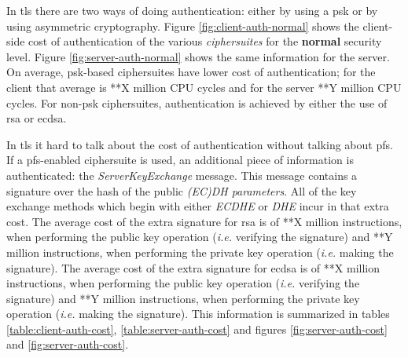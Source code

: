 \documentclass{llncs}
\begin{document}
In \gls{tls} there are two ways of doing authentication: either by using a \gls{psk} or by using asymmetric cryptography.
Figure \ref{fig:client-auth-normal} shows the client-side cost of authentication of the various \textit{ciphersuites} for 
the \textbf{normal} security level. Figure \ref{fig:server-auth-normal} shows the same information for the server.
On average, \gls{psk}-based ciphersuites have lower cost of authentication; for the client that average is
**X million CPU cycles and for the server **Y million CPU cycles. For non-\gls{psk} ciphersuites, authentication
is achieved by either the use of \gls{rsa} or \gls{ecdsa}.

In \gls{tls} it hard to talk about the cost of authentication without talking about \gls{pfs}. If a \gls{pfs}-enabled
ciphersuite is used, an additional piece of information is authenticated: the \textit{ServerKeyExchange} message.
This message contains a signature over the hash of the public \textit{(EC)DH parameters}. All of the key exchange methods
which begin with either \textit{ECDHE} or \textit{DHE} incur in that extra cost. The average cost of the extra signature 
for \gls{rsa} is of **X million instructions, when performing the public key operation (\textit{i.e.} verifying 
the signature) and **Y million instructions, when performing the private key operation (\textit{i.e.} making the 
signature). The average cost of the extra signature for \gls{ecdsa} is of **X million instructions, 
when performing the public key operation  (\textit{i.e.} verifying the signature) and **Y million instructions, 
when performing the private key operation (\textit{i.e.} making the signature). This information is summarized 
in tables \ref{table:client-auth-cost}, \ref{table:server-auth-cost} and figures \ref{fig:server-auth-cost} and
\ref{fig:server-auth-cost}.
\end{document}
